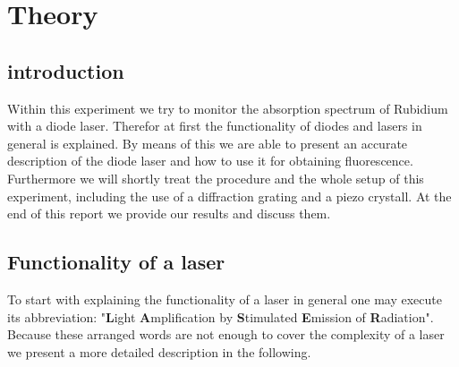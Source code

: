 \section{Theory}
\label{sec:theory}

\subsection{introduction}

Within this experiment we try to monitor the absorption spectrum of Rubidium with a diode laser.
Therefor at first the functionality of diodes and lasers in general is explained.
By means of this we are able to present an accurate description of the diode laser and how to
use it for obtaining fluorescence.
Furthermore we will shortly treat the procedure and the whole setup of this experiment, including
the use of a diffraction grating and a piezo crystall.
At the end of this report we provide our results and discuss them.

\subsection{Functionality of a laser}
\label{sec:laser}

To start with explaining the functionality of a laser in general one may execute its abbreviation: "\textbf{L}ight \textbf{A}mplification by \textbf{S}timulated \textbf{E}mission of \textbf{R}adiation".
Because these arranged words are not enough to cover the complexity of a laser we present a more detailed
description in the following.

